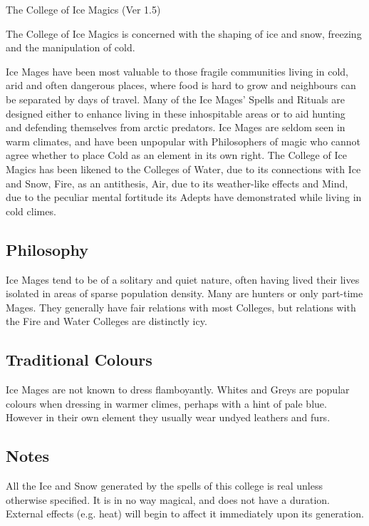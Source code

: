 \begin{Chapter}{The College of Ice Magics (Ver 1.5)}

The College of Ice Magics is concerned with the shaping of ice and
snow, freezing and the manipulation of cold.

Ice Mages have been most valuable to those fragile communities living
in cold, arid and often dangerous places, where food is hard to grow
and neighbours can be separated by days of travel.  Many of the Ice
Mages’ Spells and Rituals are designed either to enhance living in
these inhospitable areas or to aid hunting and defending themselves
from arctic predators. Ice Mages are seldom seen in warm climates, and
have been unpopular with Philosophers of magic who cannot agree
whether to place Cold as an element in its own right.  The College of
Ice Magics has been likened to the Colleges of Water, due to its
connections with Ice and Snow, Fire, as an antithesis, Air, due to its
weather-like effects and Mind, due to the peculiar mental fortitude
its Adepts have demonstrated while living in cold climes.

\subsection{Philosophy}

Ice Mages tend to be of a solitary and quiet nature, often having
lived their lives isolated in areas of sparse population density.
Many are hunters or only part-time Mages.  They generally have fair
relations with most Colleges, but relations with the Fire and Water
Colleges are distinctly icy.

\subsection{Traditional Colours}

Ice Mages are not known to dress flamboyantly.  Whites and Greys are
popular colours when dressing in warmer climes, perhaps with a hint of
pale blue.  However in their own element they usually wear undyed
leathers and furs.

\subsection{Notes}

All the Ice and Snow generated by the spells of this college is real
unless otherwise specified. It is in no way magical, and does not have
a duration. External effects (e.g. heat) will begin to affect it
immediately upon its generation.


\end{Chapter}
